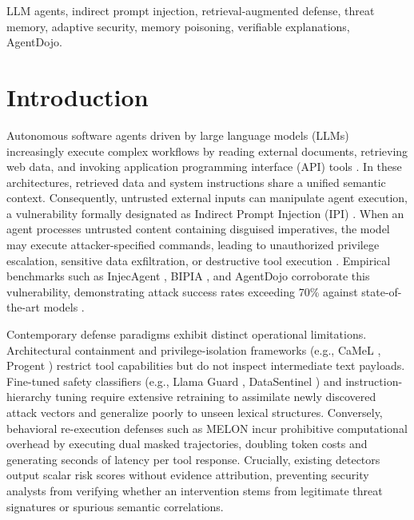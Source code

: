 \documentclass[conference]{IEEEtran}
\begin{document}
\begin{IEEEkeywords}
LLM agents, indirect prompt injection, retrieval-augmented defense, threat memory, adaptive security, memory poisoning, verifiable explanations, AgentDojo.
\end{IEEEkeywords}

\section{Introduction}
Autonomous software agents driven by large language models (LLMs) increasingly execute complex workflows by reading external documents, retrieving web data, and invoking application programming interface (API) tools \cite{yao2023react, schick2023toolformer}. In these architectures, retrieved data and system instructions share a unified semantic context. Consequently, untrusted external inputs can manipulate agent execution, a vulnerability formally designated as Indirect Prompt Injection (IPI) \cite{greshake2023not, owasp2025llm01}. When an agent processes untrusted content containing disguised imperatives, the model may execute attacker-specified commands, leading to unauthorized privilege escalation, sensitive data exfiltration, or destructive tool execution \cite{vassilev2025adversarial}. Empirical benchmarks such as InjecAgent \cite{zhan2024injecagent}, BIPIA \cite{yi2023benchmarking}, and AgentDojo \cite{debenedetti2024agentdojo} corroborate this vulnerability, demonstrating attack success rates exceeding 70\% against state-of-the-art models \cite{wang2025agentvigil, zhan2025adaptive}.

Contemporary defense paradigms exhibit distinct operational limitations. Architectural containment and privilege-isolation frameworks (e.g., CaMeL \cite{debenedetti2025defeating}, Progent \cite{shi2025progent}) restrict tool capabilities but do not inspect intermediate text payloads. Fine-tuned safety classifiers (e.g., Llama Guard \cite{inan2023llama}, DataSentinel \cite{liu2025datasentinel}) and instruction-hierarchy tuning \cite{wallace2024instruction} require extensive retraining to assimilate newly discovered attack vectors and generalize poorly to unseen lexical structures. Conversely, behavioral re-execution defenses such as MELON \cite{zhu2025melon} incur prohibitive computational overhead by executing dual masked trajectories, doubling token costs and generating seconds of latency per tool response. Crucially, existing detectors output scalar risk scores without evidence attribution, preventing security analysts from verifying whether an intervention stems from legitimate threat signatures or spurious semantic correlations.
\end{document}
